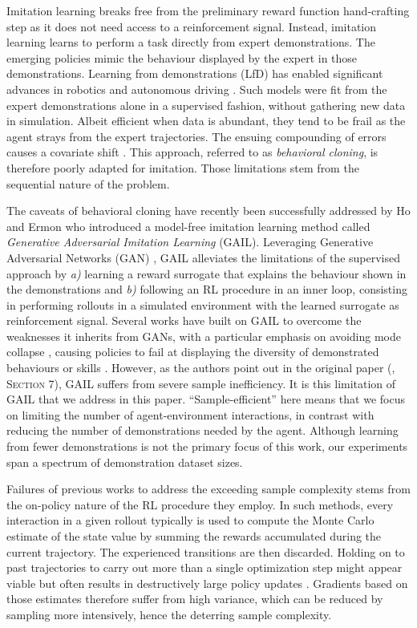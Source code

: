 Imitation learning breaks free from the preliminary reward function
hand-crafting step as it does not need access to a reinforcement signal.
Instead, imitation learning learns to perform a task directly from expert
demonstrations.
The emerging policies mimic the behaviour displayed by the expert in those
demonstrations.
Learning from demonstrations (LfD) has enabled significant advances in robotics
\cite{Billard2008-jb} and autonomous driving \cite{Pomerleau1989-nh,
Pomerleau1990-lm}.
Such models were fit from the expert demonstrations alone in a supervised
fashion, without gathering new data in simulation.
Albeit efficient when data is abundant, they tend to be frail as the agent
strays from the expert trajectories.
The ensuing compounding of errors causes a covariate shift \cite{Ross2010-eb,
Ross2011-dn}.
This approach, referred to as \textit{behavioral cloning}, is therefore poorly
adapted
for imitation.
Those limitations stem from the sequential nature of the problem.

The caveats of behavioral cloning have recently been successfully addressed by
Ho and Ermon \cite{Ho2016-bv} who introduced a model-free imitation learning
method called \textit{Generative Adversarial Imitation Learning} (GAIL).
Leveraging Generative Adversarial Networks (GAN) \cite{Goodfellow2014-yk},
GAIL alleviates the limitations of the supervised approach by
\textit{a)} learning a reward surrogate that explains the behaviour shown in the
demonstrations and
\textit{b)} following an RL procedure in an inner loop, consisting in performing
rollouts in a simulated environment with the learned surrogate as
reinforcement signal.
Several works have built on GAIL to overcome the weaknesses it inherits from
GANs, with a particular emphasis on avoiding mode collapse
\cite{Li2017-sb, Hausman2017-hb, Kuefler2017-zu},
causing policies to fail at displaying the diversity of demonstrated
behaviours or skills \cite{Goodfellow2017-pv}.
However, as the authors point out
in the original paper (\cite{Ho2016-bv}, \textsc{Section} 7),
GAIL suffers from severe sample inefficiency.
It is this limitation of GAIL that we address in this paper.
``Sample-efficient'' here means that we focus on limiting the number of
agent-environment interactions, in contrast with reducing the number of
demonstrations needed by the agent.
Although learning from fewer demonstrations is not the primary focus of this work,
our experiments span a spectrum of demonstration dataset sizes.

Failures of previous works to address the exceeding sample complexity stems
from the on-policy nature of the RL procedure they employ.
In such methods, every interaction in a given rollout typically
is used to compute the Monte Carlo estimate of the state value
by summing the rewards accumulated during the current trajectory.
The experienced transitions are then discarded.
Holding on to past trajectories to carry out more than a single optimization
step might appear viable but often results
in destructively large policy updates \cite{Schulman2017-ou}.
Gradients based on those estimates therefore suffer from high variance, which
can be reduced by sampling more intensively, hence the deterring sample
complexity.

